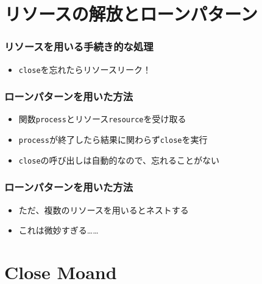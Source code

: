 \section{リソースの解放とローンパターン}

\begin{frame}
  \frametitle{リソースを用いる手続き的な処理}

  
  \begin{itemize}
    \item<3-> \lstinline|close|を忘れたらリソースリーク！
  \end{itemize}
\end{frame}

\begin{frame}
  \frametitle{ローンパターン\cite{loanpattern}を用いた方法}

  
  \begin{itemize}
    \item<3-> 関数\lstinline|process|とリソース\lstinline|resource|を受け取る
    \item<4-> \lstinline|process|が終了したら結果に関わらず\lstinline|close|を実行
    \item<5-> \lstinline|close|の呼び出しは自動的なので、忘れることがない
  \end{itemize}
\end{frame}

\begin{frame}
  \frametitle{ローンパターン\cite{loanpattern}を用いた方法}

  \begin{itemize}
    \item ただ、複数のリソースを用いるとネストする
  \end{itemize}


  \begin{itemize}
    \item<3-> これは微妙すぎる……
  \end{itemize}
\end{frame}

\section{Close Moand}

